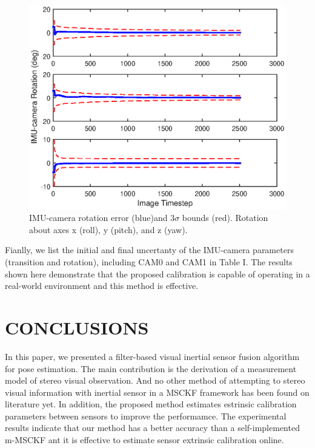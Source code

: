 \documentclass[a4paper, 10pt, conference]{ieeeconf}      %
\begin{document}
\begin{figure}[thpb]
	\centering
	
	\includegraphics[scale=0.5]{rot.eps}
	
	\caption{IMU-camera rotation error (blue)and $ 3 \sigma $ bounds (red). Rotation about axes x (roll), y (pitch), and z (yaw). }
	\label{figurelabel}
\end{figure}

 Fianlly, we list the initial and final uncertanty of the IMU-camera parameters (transition and rotation), including CAM0 and CAM1 in Table I. The results shown here demonstrate that the proposed calibration is capable of operating in a real-world environment and this method is effective.



\section{CONCLUSIONS}
In this paper, we presented a filter-based visual inertial sensor fusion algorithm for pose estimation. The main contribution is the derivation of a measurement model of stereo visual observation. And no other method
of attempting to stereo visual information with inertial
sensor in a MSCKF framework has been found on literature yet. In addition, the proposed method estimates estrinsic calibration parameters between sensors to improve the performamce. The experimental results indicate that our method has a better accuracy than a self-implemented m-MSCKF ant it is effective to estimate sensor extrinsic calibration online.
\end{document}
